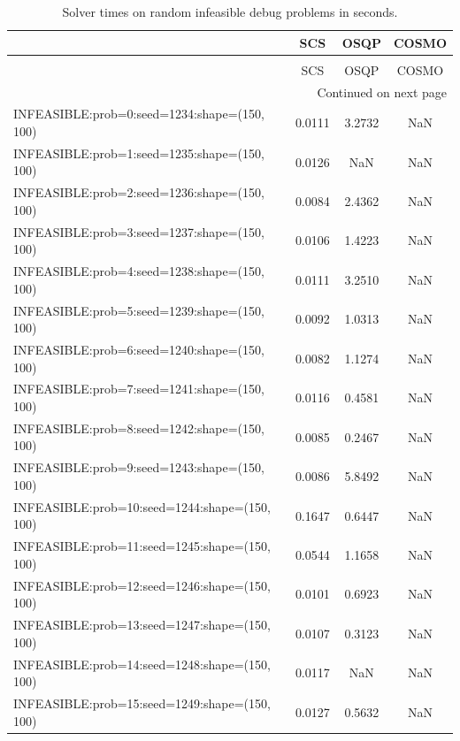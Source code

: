 \begin{longtable}{lccc}
\caption{Solver times on random infeasible debug problems in seconds.}
\label{t-random infeasible debug-results}\\
\toprule
{} &    SCS &    OSQP &  COSMO \\
\midrule
\endfirsthead
\caption[]{Solver times on random infeasible debug problems in seconds.} \\
\toprule
{} &    SCS &    OSQP &  COSMO \\
\midrule
\endhead
\midrule
\multicolumn{4}{r}{{Continued on next page}} \\
\midrule
\endfoot

\bottomrule
\endlastfoot
INFEASIBLE:prob=0:seed=1234:shape=(150, 100)   & 0.0111 &  3.2732 &    NaN \\
INFEASIBLE:prob=1:seed=1235:shape=(150, 100)   & 0.0126 &     NaN &    NaN \\
INFEASIBLE:prob=2:seed=1236:shape=(150, 100)   & 0.0084 &  2.4362 &    NaN \\
INFEASIBLE:prob=3:seed=1237:shape=(150, 100)   & 0.0106 &  1.4223 &    NaN \\
INFEASIBLE:prob=4:seed=1238:shape=(150, 100)   & 0.0111 &  3.2510 &    NaN \\
INFEASIBLE:prob=5:seed=1239:shape=(150, 100)   & 0.0092 &  1.0313 &    NaN \\
INFEASIBLE:prob=6:seed=1240:shape=(150, 100)   & 0.0082 &  1.1274 &    NaN \\
INFEASIBLE:prob=7:seed=1241:shape=(150, 100)   & 0.0116 &  0.4581 &    NaN \\
INFEASIBLE:prob=8:seed=1242:shape=(150, 100)   & 0.0085 &  0.2467 &    NaN \\
INFEASIBLE:prob=9:seed=1243:shape=(150, 100)   & 0.0086 &  5.8492 &    NaN \\
INFEASIBLE:prob=10:seed=1244:shape=(150, 100)  & 0.1647 &  0.6447 &    NaN \\
INFEASIBLE:prob=11:seed=1245:shape=(150, 100)  & 0.0544 &  1.1658 &    NaN \\
INFEASIBLE:prob=12:seed=1246:shape=(150, 100)  & 0.0101 &  0.6923 &    NaN \\
INFEASIBLE:prob=13:seed=1247:shape=(150, 100)  & 0.0107 &  0.3123 &    NaN \\
INFEASIBLE:prob=14:seed=1248:shape=(150, 100)  & 0.0117 &     NaN &    NaN \\
INFEASIBLE:prob=15:seed=1249:shape=(150, 100)  & 0.0127 &  0.5632 &    NaN \\

\end{longtable}

